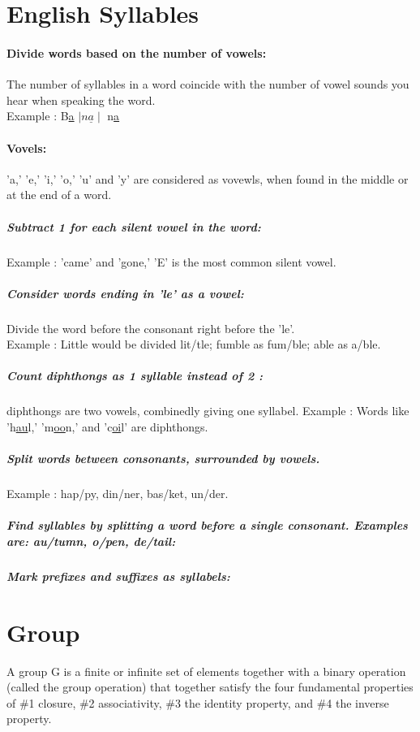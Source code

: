 \documentclass[12pt]{article}
\begin{document}
\section{English Syllables}
\paragraph{Divide words based on the number of vowels: } The number of syllables in a word coincide with the number of vowel sounds you hear when speaking the word.  \\

Example : B\underline{a} $\mid n\underline{a} \mid$ n\underline{a}

\paragraph{Vovels:} 'a,' 'e,' 'i,' 'o,' 'u' and 'y' are considered as vovewls, when found in the middle or at the end of a word.

\subparagraph{Subtract 1 for each silent vowel in the word:} Example : 'came' and 'gone,' 'E' is the most common silent vowel.

\subparagraph{Consider words ending in 'le' as a vowel:} Divide the word before the consonant right before the 'le'. \\
Example : Little would be divided lit/tle; fumble as fum/ble; able as a/ble.

\subparagraph{Count diphthongs as 1 syllable instead of 2 : } diphthongs are two vowels, combinedly giving one syllabel. Example : Words like 'h\underline{au}l,' 'm\underline{oo}n,' and 'c\underline{oi}l' are diphthongs.

\subparagraph{Split words between consonants, surrounded by vowels.} Example :  hap/py, din/ner, bas/ket, un/der. 

\subparagraph{Find syllables by splitting a word before a single consonant. Examples are: au/tumn, o/pen, de/tail:}

\subparagraph{Mark prefixes and suffixes as syllabels: }

\pagebreak
\section{Group}

A group G is a finite or infinite set of elements together with a binary operation (called the group operation) that together satisfy the four fundamental properties of \#1 closure, \#2 associativity, \#3 the identity property, and \#4 the inverse property. 
\end{document}
